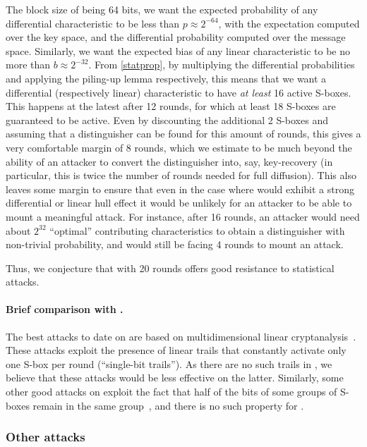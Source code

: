 The block size of \fly being 64 bits, we want
the expected probability of any differential characteristic to be less than 
$p \approx 2^{-64}$,  with the expectation computed over the key space, and the differential probability computed over the message space.
Similarly, we want the expected bias of any linear characteristic to be no more than $b \approx 2^{-32}$. From
\autoref{statprop}, by multiplying the differential probabilities and applying the piling-up lemma respectively, this means that we want a differential
(respectively linear) characteristic to have \emph{at least} 16 active S-boxes. This happens at the latest after 12 rounds, for which at least 18 S-boxes are guaranteed to be active.
Even by discounting the additional 2 S-boxes and assuming that a distinguisher can be found for this amount of rounds, this gives a very comfortable margin of 8 rounds,
which we estimate to be much beyond the ability of an attacker to convert the distinguisher into, say, key-recovery (in particular, this is twice the number of rounds needed
for full diffusion).
This also leaves some margin to ensure that even in the case where \fly would exhibit a strong differential or linear hull effect it would be unlikely for an attacker to be able
to mount a meaningful attack. For instance, after 16 rounds, an attacker would need about $2^{32}$ ``optimal'' contributing characteristics to obtain a distinguisher with non-trivial
probability, and would still be facing 4 rounds to mount an attack.

Thus, we conjecture that \fly with 20 rounds offers good resistance to statistical attacks.

\paragraph{Brief comparison with \present.}
The best attacks to date on \present are based on multidimensional linear cryptanalysis~\cite{DBLP:conf/ctrsa/Cho10,DBLP:journals/iacr/BogdanovTV16}. These attacks exploit the presence of linear trails
that constantly activate only one S-box per round (\ie ``single-bit trails''). As there are no such trails in \fly, we believe that these attacks would be less effective
on the latter. Similarly, some other good attacks on \present exploit the fact that half of the bits of some groups of S-boxes remain in the same group~\cite{DBLP:conf/ctrsa/CollardS09},
and there is no such property for \fly.

\subsubsection{Other attacks}

